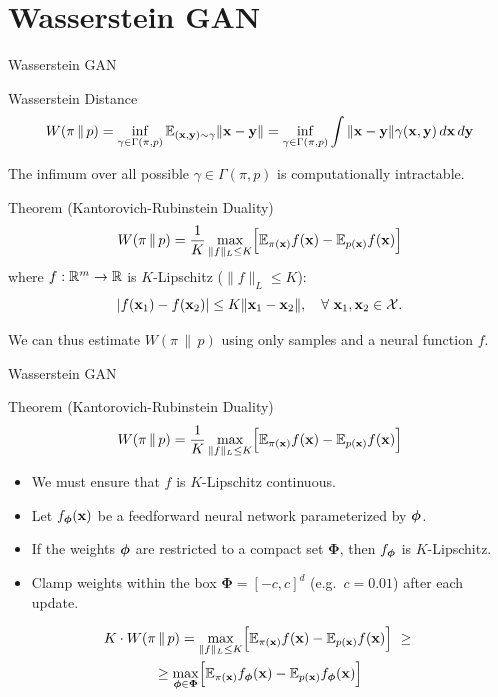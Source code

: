 \documentclass{beamer}
\begin{document}
\section{Wasserstein GAN}
\begin{frame}{Wasserstein GAN}
	\begin{block}{Wasserstein Distance}
		\vspace{-0.5cm}
		\[
		W(\pi\,\|\,p) = \inf_{\gamma \in \Gamma(\pi, p)} \mathbb{E}_{(\mathbf{x}, \mathbf{y}) \sim \gamma} \| \mathbf{x} - \mathbf{y} \| =  \inf_{\gamma \in \Gamma(\pi, p)} \int \|\mathbf{x} - \mathbf{y}\| \gamma (\mathbf{x}, \mathbf{y})\, d\mathbf{x}\, d\mathbf{y}
		\]
		\vspace{-0.3cm}
	\end{block}
	The infimum over all possible $\gamma \in \Gamma(\pi, p)$ is computationally intractable.
	\begin{block}{Theorem (Kantorovich-Rubinstein Duality)}
		\vspace{-0.3cm}
		\[
		W(\pi\,\|\,p) = \frac{1}{K} \max_{\| f \|_L \leq K} \Bigl[ \mathbb{E}_{\pi(\mathbf{x})} f(\mathbf{x})  - \mathbb{E}_{p(\mathbf{x})} f(\mathbf{x})\Bigr]
		\]
		where $f : \mathbb{R}^m \rightarrow \mathbb{R}$ is $K$-Lipschitz ($\|f\|_L \leq K$):
		\[
		|f(\mathbf{x}_1) - f(\mathbf{x}_2)| \leq K \|\mathbf{x}_1 - \mathbf{x}_2\|,\quad \forall\ \mathbf{x}_1, \mathbf{x}_2 \in \mathcal{X}.
		\]
		\vspace{-0.6cm}
	\end{block}
	We can thus estimate $W(\pi\,\|\,p)$ using only samples and a neural function $f$.
	
\end{frame}
\begin{frame}{Wasserstein GAN}
	\begin{block}{Theorem (Kantorovich-Rubinstein Duality)}
		\[
		W(\pi\,\|\,p) = \frac{1}{K} \max_{\| f \|_L \leq K} \Bigl[ \mathbb{E}_{\pi(\mathbf{x})} f(\mathbf{x})  - \mathbb{E}_{p(\mathbf{x})} f(\mathbf{x})\Bigr]
		\]
	\end{block}
	\begin{itemize}
		\item We must ensure that $f$ is $K$-Lipschitz continuous.
		\item Let $f_{\boldsymbol{\phi}}(\mathbf{x})$ be a feedforward neural network parameterized by $\boldsymbol{\phi}$.
		\item If the weights $\boldsymbol{\phi}$ are restricted to a compact set $\boldsymbol{\Phi}$, then $f_{\boldsymbol{\phi}}$ is $K$-Lipschitz.
		\item Clamp weights within the box $\boldsymbol{\Phi} = [-c, c]^d$ (e.g.\ $c = 0.01$) after each update.
	\end{itemize}
	\begin{multline*}
		K \cdot W(\pi\,\|\,p) = \max_{\| f \|_L \leq K} \Bigl[ \mathbb{E}_{\pi(\mathbf{x})} f(\mathbf{x})  - \mathbb{E}_{p(\mathbf{x})} f(\mathbf{x})\Bigr]\ \geq\ \\  \geq \max_{\boldsymbol{\phi} \in \boldsymbol{\Phi}} \Bigl[ \mathbb{E}_{\pi(\mathbf{x})} f_{\boldsymbol{\phi}}(\mathbf{x})  - \mathbb{E}_{p(\mathbf{x})} f_{\boldsymbol{\phi}}(\mathbf{x})\Bigr]
	\end{multline*}
\end{frame}
\end{document}
